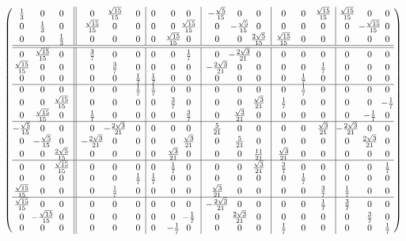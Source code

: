 \begin{small}
\begin{align*}
\left(
\begin{array}{@{}c@{}c@{}c||c@{}cc|cc@{}c|c@{}c@{}c|ccc|@{}c@{}c@{}c@{}}
\frac{1}{3}&0&0&
0&\frac{\sqrt{15}}{15}&0&
0&0&0&
-\frac{\sqrt{5}}{15}&0&0&
0&0&\frac{\sqrt{15}}{15}&
\frac{\sqrt{15}}{15}&0&0\\
0&\frac{1}{3}&0&
\frac{\sqrt{15}}{15}&0&0&
0&0&\frac{\sqrt{15}}{15}&
0&-\frac{\sqrt{5}}{15}&0&
0&0&0&
0&-\frac{\sqrt{15}}{15}&0\\
0&0&\frac{1}{3}&
0&0&0&
0&\frac{\sqrt{15}}{15}&0&
0&0&\frac{2\sqrt{5}}{15}&
\frac{\sqrt{15}}{15}&0&0&
0&0&0\\
\hline
\hline
0&\frac{\sqrt{15}}{15}&0&
\frac{3}{7}&0&0&
0&0&\frac{1}{7}&
0&-\frac{2\sqrt{3}}{21}&0&
0&0&0&
0&0&0\\
\frac{\sqrt{15}}{15}&0&0&
0&\frac{3}{7}&0&
0&0&0&
-\frac{2\sqrt{3}}{21}&0&0&
0&0&\frac{1}{7}&
0&0&0\\
0&0&0&
0&0&\frac{1}{7}&
\frac{1}{7}&0&0&
0&0&0&
0&\frac{1}{7}&0&
0&0&0\\
\hline
0&0&0&
0&0&\frac{1}{7}&
\frac{1}{7}&0&0&
0&0&0&
0&\frac{1}{7}&0&
0&0&0\\
0&0&\frac{\sqrt{15}}{15}&
0&0&0&
0&\frac{3}{7}&0&
0&0&\frac{\sqrt{3}}{21}&
\frac{1}{7}&0&0&
0&0&-\frac{1}{7}\\
0&\frac{\sqrt{15}}{15}&0&
\frac{1}{7}&0&0&
0&0&\frac{3}{7}&
0&\frac{\sqrt{3}}{21}&0&
0&0&0&
0&-\frac{1}{7}&0\\
\hline
-\frac{\sqrt{5}}{15}&0&0&
0&-\frac{2\sqrt{3}}{21}&0&
0&0&0&
\frac{5}{21}&0&0&
0&0&\frac{\sqrt{3}}{21}&
-\frac{2\sqrt{3}}{21}&0&0\\
0&-\frac{\sqrt{5}}{15}&0&
-\frac{2\sqrt{3}}{21}&0&0&
0&0&\frac{\sqrt{3}}{21}&
0&\frac{5}{21}&0&
0&0&0&
0&\frac{2\sqrt{3}}{21}&0\\
0&0&\frac{2\sqrt{5}}{15}&
0&0&0&
0&\frac{\sqrt{3}}{21}&0&
0&0&\frac{11}{21}&
\frac{\sqrt{3}}{21}&0&0&
0&0&0\\
\hline
0&0&\frac{\sqrt{15}}{15}&
0&0&0&
0&\frac{1}{7}&0&
0&0&\frac{\sqrt{3}}{21}&
\frac{3}{7}&0&0&
0&0&\frac{1}{7}\\
0&0&0&
0&0&\frac{1}{7}&
\frac{1}{7}&0&0&
0&0&0&
0&\frac{1}{7}&0&
0&0&0\\
\frac{\sqrt{15}}{15}&0&0&
0&\frac{1}{7}&0&
0&0&0&
\frac{\sqrt{3}}{21}&0&0&
0&0&\frac{3}{7}&
\frac{1}{7}&0&0\\
\hline
\frac{\sqrt{15}}{15}&0&0&
0&0&0&
0&0&0&
-\frac{2\sqrt{3}}{21}&0&0&
0&0&\frac{1}{7}&
\frac{3}{7}&0&0\\
0&-\frac{\sqrt{15}}{15}&0&
0&0&0&
0&0&-\frac{1}{7}&
0&\frac{2\sqrt{3}}{21}&0&
0&0&0&
0&\frac{3}{7}&0\\
0&0&0&
0&0&0&
0&-\frac{1}{7}&0&
0&0&0&
\frac{1}{7}&0&0&
0&0&\frac{1}{7}
\end{array}
\right)
\end{align*}
\end{small}
